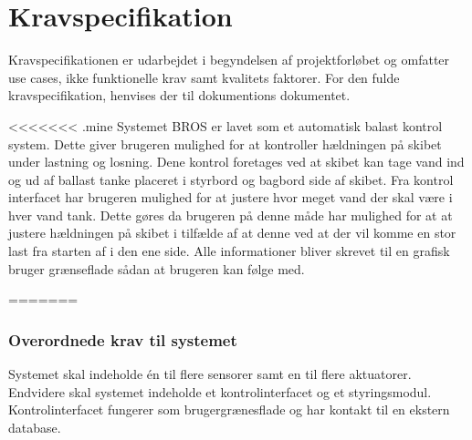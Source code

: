 \chapter{Kravspecifikation}
Kravspecifikationen er udarbejdet i begyndelsen af projektforløbet og omfatter use cases, ikke funktionelle krav samt kvalitets faktorer. For den fulde kravspecifikation, henvises der til dokumentions dokumentet.

<<<<<<< .mine
Systemet BROS er lavet som et automatisk balast kontrol system. Dette giver brugeren mulighed for at kontroller hældningen på skibet under lastning og losning. Dene kontrol foretages ved at skibet kan tage vand ind og ud af ballast tanke placeret i styrbord og bagbord side af skibet. Fra kontrol interfacet har brugeren mulighed for at justere hvor meget vand der skal være i hver vand tank. Dette gøres da brugeren på denne måde har mulighed for at at justere hældningen på skibet i tilfælde af at denne ved at der vil komme en stor last fra starten af i den ene side.
Alle informationer bliver skrevet til en grafisk bruger grænseflade sådan at brugeren kan følge med.


=======
\subsection{Overordnede krav til systemet}
Systemet skal indeholde én til flere sensorer samt en til flere aktuatorer. Endvidere skal systemet indeholde et kontrolinterfacet og et styringsmodul. Kontrolinterfacet fungerer som brugergrænesflade og har kontakt til en ekstern database.

